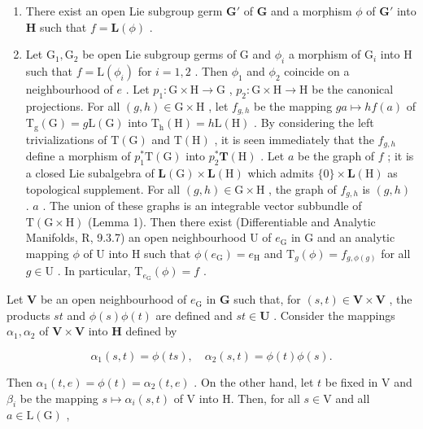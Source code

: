 \begin{enumerate}
\def\labelenumi{(\roman{enumi})}
\item
  There exist an open Lie subgroup germ \(\mathbf{G}'\) of \(\mathbf{G}\) and a morphism \(\phi\) of \(\mathbf{G}'\) into \(\mathbf{H}\) such that \(f = \mathbf{L}(\phi)\) .
\item
  Let \(\mathrm{G}_1, \mathrm{G}_2\) be open Lie subgroup germs of G and \(\phi_i\) a morphism of \(\mathrm{G}_i\) into H such that \(f = \mathrm{L}(\phi_i)\) for \(i = 1, 2\) . Then \(\phi_1\) and \(\phi_2\) coincide on a neighbourhood of \(e\) . Let \(p_1: \mathrm{G} \times \mathrm{H} \to \mathrm{G}\) , \(p_2: \mathrm{G} \times \mathrm{H} \to \mathrm{H}\) be the canonical projections. For all \((g,h) \in \mathrm{G} \times \mathrm{H}\) , let \(f_{g,h}\) be the mapping \(ga \mapsto hf(a)\) of \(\mathrm{T_g(G)} = g\mathrm{L(G)}\) into \(\mathrm{T_h(H)} = h\mathrm{L(H)}\) . By considering the left trivializations of \(\mathrm{T(G)}\) and \(\mathrm{T(H)}\) , it is seen immediately that the \(f_{g,h}\) define a morphism of \(p_1^*\mathrm{T(G)}\) into \(p_{2}^{*}\mathbf{T}(\mathrm{H})\) . Let \(a\) be the graph of \(f\) ; it is a closed Lie subalgebra of \(\mathbf{L}(\mathrm{G}) \times \mathbf{L}(\mathrm{H})\) which admits \(\{0\} \times \mathbf{L}(\mathrm{H})\) as topological supplement. For all \((g,h) \in \mathrm{G} \times \mathrm{H}\) , the graph of \(f_{g,h}\) is \((g,h)\) . \(a\) . The union of these graphs is an integrable vector subbundle of \(\mathrm{T}(\mathrm{G} \times \mathrm{H})\) (Lemma 1). Then there exist (Differentiable and Analytic Manifolds, R, 9.3.7) an open neighbourhood \(\mathrm{U}\) of \(e_{\mathrm{G}}\) in \(\mathrm{G}\) and an analytic mapping \(\phi\) of \(\mathrm{U}\) into \(\mathrm{H}\) such that \(\phi(e_{\mathrm{G}}) = e_{\mathrm{H}}\) and \(\mathrm{T}_{g}(\phi) = f_{g,\phi(g)}\) for all \(g \in \mathrm{U}\) . In particular, \(\mathrm{T}_{e_{\mathrm{G}}}(\phi) = f\) .
\end{enumerate}

Let \(\mathbf{V}\) be an open neighbourhood of \(e_{\mathrm{G}}\) in \(\mathbf{G}\) such that, for \((s,t)\in \mathbf{V}\times \mathbf{V}\) , the products \(st\) and \(\phi (s)\phi (t)\) are defined and \(st\in \mathbf{U}\) . Consider the mappings \(\alpha_{1},\alpha_{2}\) of \(\mathbf{V}\times \mathbf{V}\) into \(\mathbf{H}\) defined by

\[
\alpha_ {1} (s, t) = \phi (t s), \quad \alpha_ {2} (s, t) = \phi (t) \phi (s).
\]

Then \(\alpha_{1}(t,e) = \phi (t) = \alpha_{2}(t,e)\) . On the other hand, let \(t\) be fixed in V and \(\beta_{i}\) be the mapping \(s\mapsto \alpha_i(s,t)\) of V into H. Then, for all \(s\in \mathrm{V}\) and all \(a\in \mathrm{L}(\mathrm{G})\) ,

